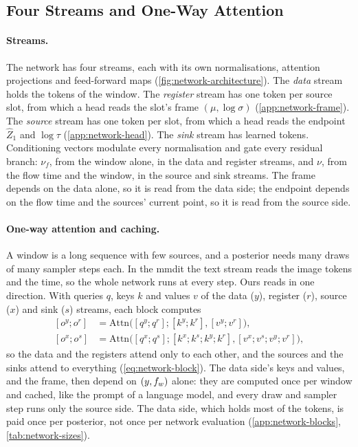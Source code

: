 \subsection{Four Streams and One-Way Attention}
\label{sec:method-streams}

\paragraph{Streams.}
The network has four streams, each with its own normalisations, attention projections and
feed-forward maps (\cref{fig:network-architecture}). The \emph{data} stream holds the tokens of the
window. The \emph{register} stream \citep{darcet2024vision} has one token per source slot, from
which a head reads the slot's frame $(\mu,\log\sigma)$ (\cref{app:network-frame}). The
\emph{source} stream has one token per slot, from which a head reads the endpoint $\hat Z_1$ and
$\log\tau$ (\cref{app:network-head}). The \emph{sink} stream has \NetworkSinksWord{} learned
tokens. Conditioning vectors modulate every normalisation and gate every residual branch: $\nu_f$,
from the window alone, in the data and register streams, and $\nu$, from the flow time and the
window, in the source and sink streams. The frame depends on the data alone, so it is read from the
data side; the endpoint depends on the flow time and the sources' current point, so it is read from
the source side.

\paragraph{One-way attention and caching.}
A window is a long sequence with few sources, and a posterior needs many draws of many sampler
steps each. In the \ac{mmdit} the text stream reads the image tokens and the time, so the whole
network runs at every step. Ours reads in one direction. With queries $q$, keys
$k$ and values $v$ of the data ($y$), register ($r$), source ($x$) and sink ($s$) streams, each
block computes
\begin{equation}
\begin{aligned}
  [o^y; o^r] &= \mathrm{Attn}\bigl([q^y; q^r]; [k^y; k^r], [v^y; v^r]\bigr),\\
  [o^x; o^s] &= \mathrm{Attn}\bigl([q^x; q^s]; [k^x; k^s; k^y; k^r], [v^x; v^s; v^y; v^r]\bigr),
\end{aligned}
  \label{eq:network-oneway}
\end{equation}
so the data and the registers attend only to each other, and the sources and the sinks attend to
everything (\cref{eq:network-block}). The data side's keys and values, and the frame, then depend
on $(y,f_{w})$ alone: they are computed once per window and cached, like the prompt of a language
model, and every draw and sampler step runs only the source side. The data side, which holds most
of the tokens, is paid once per posterior, not once per network evaluation
(\cref{app:network-blocks}, \cref{tab:network-sizes}).

